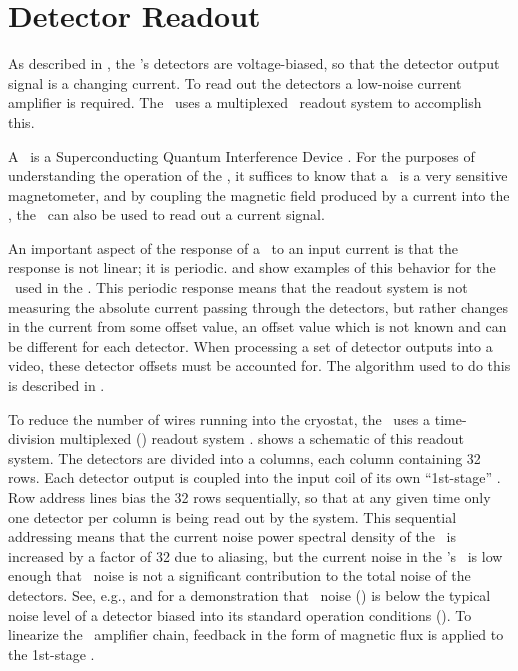 \section{Detector Readout} \label{sec:det-readout}

As described in , the \Imager's detectors are voltage-biased, so that the detector output signal is a changing current.
To read out the detectors a low-noise current amplifier is required.
The \Imager\ uses a multiplexed \SQUID\ readout system to accomplish this.

A \SQUID\ is a Superconducting Quantum Interference Device \cite{clarke_squid_2002}.
For the purposes of understanding the operation of the \Imager, it suffices to know that a \SQUID\ is a very sensitive magnetometer, and by coupling the magnetic field produced by a current into the \SQUID, the \SQUID\ can also be used to read out a current signal.

An important aspect of the response of a \SQUID\ to an input current is that the response is not linear; it is periodic.
 and  show examples of this behavior for the \SQUIDs\ used in the \Imager.
This periodic response means that the readout system is not measuring the absolute current passing through the detectors, but rather changes in the current from some offset value, an offset value which is not known and can be different for each detector.
When processing a set of detector outputs into a video, these detector offsets must be accounted for.
The algorithm used to do this is described in .

To reduce the number of wires running into the cryostat, the \Imager\ uses a time-division multiplexed (\TDM) readout system \cite{chervenak_superconducting_1999,korte_time-division_2003,reintsema_prototype_2003}.
 shows a schematic of this readout system.
The detectors are divided into a columns, each column containing 32 rows.
Each detector output is coupled into the input coil of its own ``1st-stage'' \SQUID.
Row address lines bias the 32 rows sequentially, so that at any given time only one detector per column is being read out by the system.
This sequential addressing means that the current noise power spectral density of the \SQUIDs\ is increased by a factor of 32 due to aliasing, but the current noise in the \Imager's \SQUIDs\ is low enough that \SQUID\ noise is not a significant contribution to the total noise of the detectors.
See, e.g.,  and  for a demonstration that \SQUID\ noise () is below the typical noise level of a detector biased into its standard operation conditions ().
To linearize the \SQUID\ amplifier chain, feedback in the form of magnetic flux is applied to the 1st-stage \SQUIDs.

